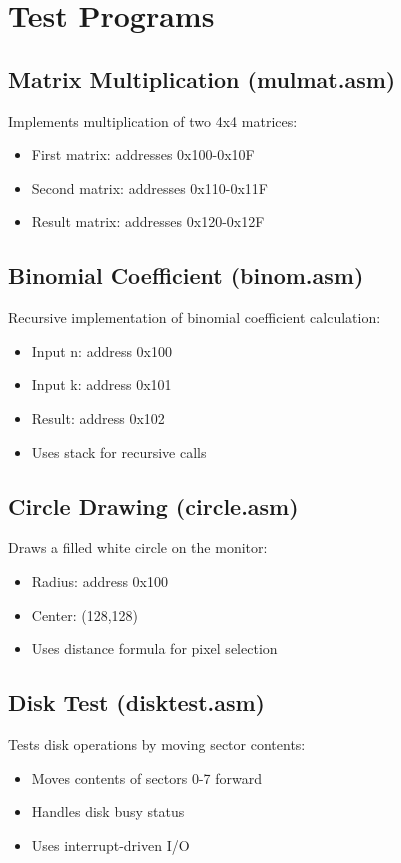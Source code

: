 \documentclass{article}
\begin{document}
\section{Test Programs}
\subsection{Matrix Multiplication (mulmat.asm)}
Implements multiplication of two 4x4 matrices:
\begin{itemize}
    \item First matrix: addresses 0x100-0x10F
    \item Second matrix: addresses 0x110-0x11F
    \item Result matrix: addresses 0x120-0x12F
\end{itemize}

\subsection{Binomial Coefficient (binom.asm)}
Recursive implementation of binomial coefficient calculation:
\begin{itemize}
    \item Input n: address 0x100
    \item Input k: address 0x101
    \item Result: address 0x102
    \item Uses stack for recursive calls
\end{itemize}

\subsection{Circle Drawing (circle.asm)}
Draws a filled white circle on the monitor:
\begin{itemize}
    \item Radius: address 0x100
    \item Center: (128,128)
    \item Uses distance formula for pixel selection
\end{itemize}

\subsection{Disk Test (disktest.asm)}
Tests disk operations by moving sector contents:
\begin{itemize}
    \item Moves contents of sectors 0-7 forward
    \item Handles disk busy status
    \item Uses interrupt-driven I/O
\end{itemize}
\end{document}

